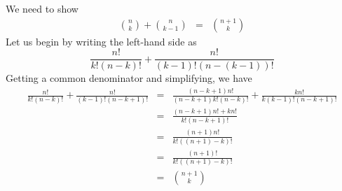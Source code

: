 \documentclass[12pt]{article}
\begin{document}
We need to show 
\begin{eqnarray*}
\binom{n}{k} + \binom{n}{k-1} & = & \binom{n+1}{k}
\end{eqnarray*}
Let us begin by writing the left-hand side as $$ \frac{n!}{k!(n-k)!} + \frac{n!}{(k-1)!(n-(k-1))!}$$
Getting a common denominator and simplifying, we have 
\begin{eqnarray*}
\frac{n!}{k!(n-k)!} + \frac{n!}{(k-1)!(n-k+1)!} & = & \frac{(n-k+1)n!}{(n-k+1)k!(n-k)!}+\frac{kn!}{k(k-1)!(n-k+1)!} \\ 
& = & \frac{(n-k+1)n!+kn!}{k!(n-k+1)!} \\
& = & \frac{(n+1)n!}{k!((n+1)-k)!} \\
& = & \frac{(n+1)!}{k!((n+1)-k)!} \\
& = & \binom{n+1}{k}
\end{eqnarray*}
\end{document}
